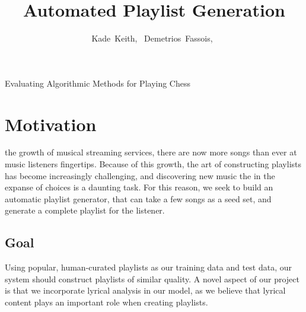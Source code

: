 \documentclass[10pt,journal,compsoc]{IEEEtran}
\begin{document}
\title{Automated Playlist Generation\\}

\author{
  Kade~Keith,~
  Demetrios~Fassois,~
}

%
{Evaluating Algorithmic Methods for Playing Chess}


\maketitle

\section{Motivation}

 the growth of musical streaming services, there are now more songs than ever at music listeners fingertips. Because of this growth, the art of constructing playlists has become increasingly challenging, and discovering new music the in the expanse of choices is a daunting task. For this reason, we seek to build an automatic playlist generator, that can take a few songs as a seed set, and generate a complete playlist for the listener.

\subsection{Goal}
Using popular, human-curated playlists as our training data and test data, our system should construct playlists of similar quality. A novel aspect of our project is that we incorporate lyrical analysis in our model, as we believe that lyrical content plays an important role when creating playlists.
\end{document}
